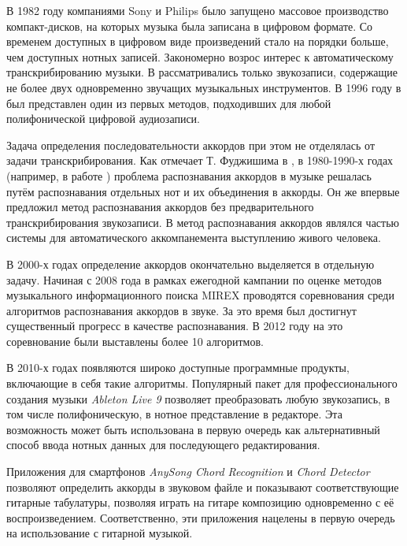 В 1982 году компаниями Sony и Philips было запущено массовое производство
компакт-дисков, на которых музыка была записана в цифровом формате. Со временем
доступных в цифровом виде произведений стало на порядки больше, чем доступных
нотных записей. Закономерно возрос интерес к автоматическому транскрибированию
музыки. В \cite{Moorer1975} рассматривались только звукозаписи, содержащие не
более двух одновременно звучащих музыкальных инструментов. В 1996 году в
\cite{Martin1996} был представлен один из первых методов, подходивших для любой
полифонической цифровой аудиозаписи.

Задача определения последовательности аккордов при этом не отделялась от задачи
транскрибирования. Как отмечает Т. Фуджишима в \cite{Fujishima1999},
в 1980-1990-х годах (например, в работе \cite{Aono1998}) проблема распознавания
аккордов в музыке решалась путём распознавания отдельных нот и их объединения в
аккорды. Он же впервые предложил метод распознавания аккордов без
предварительного транскрибирования звукозаписи. В \cite{Aono1998} метод
распознавания аккордов являлся частью системы для автоматического
аккомпанемента выступлению живого человека.

В 2000-х годах определение аккордов окончательно выделяется в отдельную задачу.
Начиная с 2008 года в рамках ежегодной кампании по оценке методов музыкального
информационного поиска MIREX \cite{MirexHome} проводятся соревнования среди
алгоритмов распознавания аккордов в звуке. За это время был достигнут
существенный прогресс в качестве распознавания. В 2012 году на это соревнование
были выставлены более 10 алгоритмов.

В 2010-х годах появляются широко доступные программные продукты, включающие в
себя такие алгоритмы. Популярный пакет для профессионального создания музыки
\emph{Ableton Live 9} \cite{AbletonLive} позволяет преобразовать любую
звукозапись, в том числе полифоническую, в нотное представление в редакторе. Эта
возможность может быть использована в первую очередь как альтернативный способ
ввода нотных данных для последующего редактирования.

Приложения для смартфонов \emph{AnySong Chord Recognition}
\cite{AnySongChordRecognition} и \emph{Chord Detector} \cite{ChordDetector} позволяют
определить аккорды в звуковом файле и показывают соответствующие гитарные
табулатуры, позволяя играть на гитаре композицию одновременно с её
воспроизведением. Соответственно, эти приложения нацелены в первую очередь на
использование с гитарной музыкой.

